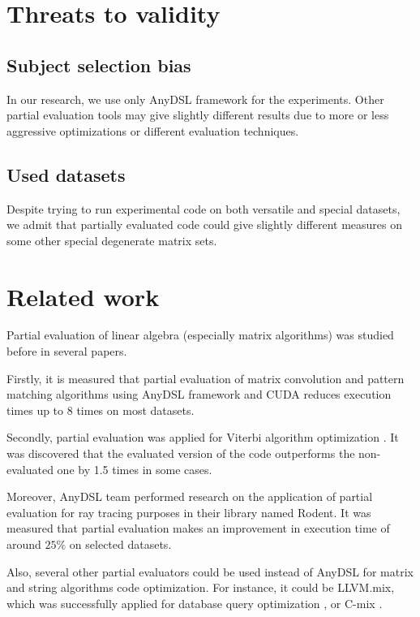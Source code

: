 \documentclass[conference]{IEEEtran}
\begin{document}
\section{Threats to validity}

\subsection{Subject selection bias}
In our research, we use only AnyDSL framework for the experiments. Other partial evaluation tools may give slightly different results due to more or less aggressive optimizations or different evaluation techniques.

\subsection{Used datasets}
Despite trying to run experimental code on both versatile and special datasets, we admit that partially evaluated code could give slightly different measures on some other special degenerate matrix sets.

\section{Related work}

Partial evaluation of linear algebra (especially matrix algorithms) was studied before in several papers.

Firstly, it is measured \cite{tyurin2020optimizing} that partial evaluation of matrix convolution and pattern matching algorithms using AnyDSL framework and CUDA reduces execution times up to 8 times on most datasets.

Secondly, partial evaluation was applied for Viterbi algorithm optimization \cite{viterbiseim}. It was discovered that the evaluated version of the code outperforms the non-evaluated one by 1.5 times in some cases.

Moreover, AnyDSL team performed research \cite{perard2019rodent} on the application of partial evaluation for ray tracing purposes in their library named Rodent. It was measured that partial evaluation makes an improvement in execution time of around $25\%$ on selected datasets.

Also, several other partial evaluators could be used instead of AnyDSL for matrix and string algorithms code optimization. For instance, it could be LLVM.mix, which was successfully applied for database query optimization \cite{sharygin2017runtime}, or C-mix \cite{jones1993partial}.
\end{document}
